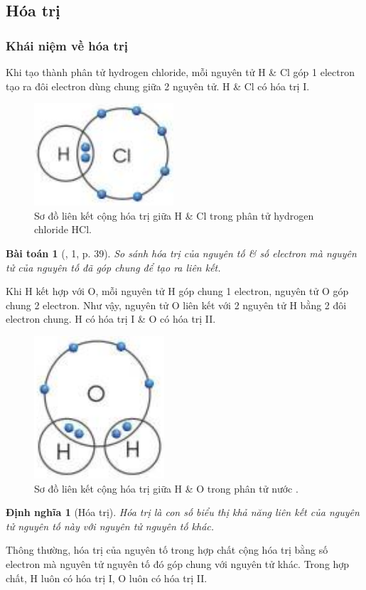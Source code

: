 \documentclass{article}
\newtheorem{baitoan}{Bài toán}
\newtheorem{dinhnghia}{Định nghĩa}
\begin{document}
\subsection{Hóa trị}

\subsubsection{Khái niệm về hóa trị}
Khi tạo thành phân tử hydrogen chloride, mỗi nguyên tử H \& Cl góp 1 electron tạo ra đôi electron dùng chung giữa 2 nguyên tử. H \& Cl có hóa trị I.
\begin{figure}[H]
	\centering
	\includegraphics[scale=0.3]{HCl}
	\caption{Sơ đồ liên kết cộng hóa trị giữa H \& Cl trong phân tử hydrogen chloride HCl.}
\end{figure}

\begin{baitoan}[\cite{SGK_KHTN_7_Canh_Dieu}, 1, p. 39]
	So sánh hóa trị của nguyên tố \& số electron mà nguyên tử của nguyên tố đã góp chung để tạo ra liên kết.
\end{baitoan}
Khi H kết hợp với O, mỗi nguyên tử H góp chung 1 electron, nguyên tử O góp chung 2 electron. Như vậy, nguyên tử O liên kết với 2 nguyên tử H bằng 2 đôi electron chung. H có hóa trị I \& O có hóa trị II.
\begin{figure}[H]
	\centering
	\includegraphics[scale=0.3]{link_H2O}
	\caption{Sơ đồ liên kết cộng hóa trị giữa H \& O trong phân tử nước .}
\end{figure}

\begin{dinhnghia}[Hóa trị]
	\emph{Hóa trị} là con số biểu thị khả năng liên kết của nguyên tử nguyên tố này với nguyên tử nguyên tố khác.
\end{dinhnghia}
Thông thường, hóa trị của nguyên tố trong hợp chất cộng hóa trị bằng số electron mà nguyên tử nguyên tố đó góp chung với nguyên tử khác. Trong hợp chất, H luôn có hóa trị I, O luôn có hóa trị II.
\end{document}
